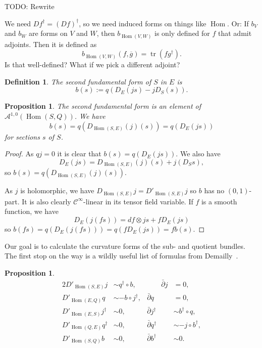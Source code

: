 \documentclass[10pt,a4paper]{article}
\newtheorem{prop}[theo]{Proposition}
\newtheorem{defi}[theo]{Definition}
\newtheorem*{proof}{Proof}
\newcommand{\cc}[1]{\mathcal{#1}}
\def\ov#1{\overline{#1}}
\DeclareMathOperator{\Hom}{Hom}
\DeclareMathOperator{\tr}{tr}
\begin{document}
TODO: Rewrite

We need $Df^\dagger = (Df)^\dagger$, so we need induced forms on things like $\Hom$. Or: If $b_V$ and $b_W$ are forms on $V$ and $W$, then $b_{\Hom(V,W)}$ is only defined for $f$ that admit adjoints. Then it is defined as
\[
b_{\Hom(V,W)}(f, \ov g) = \tr (f g^\dagger).
\]
Is that well-defined? What if we pick a different adjoint?


\begin{defi}
The \emph{second fundamental form} of $S$ in $E$ is
\[
b(s) := q(D_E(js) - jD_S(s)).
\]
\end{defi}

\begin{prop}
The second fundamental form is an element of $\cc A^{1,0}(\Hom(S,Q))$.
We have
\[
b(s)
= q(D_{\Hom(S,E)}(j)(s))
= q(D_E(js))
\]
for sections $s$ of $S$.
\end{prop}

\begin{proof}
As $qj = 0$ it is clear that $b(s) = q(D_E(js))$. We also have
\[
D_E(js) = D_{\Hom(S,E)}(j)(s) + j(D_Ss),
\]
so $b(s) = q(D_{\Hom(S,E)}(j)(s))$.

As $j$ is holomorphic, we have $D_{\Hom(S,E)}j = D'_{\Hom(S,E)}j$ so $b$ has no $(0,1)$-part. It is also clearly $\cc C^\infty$-linear in its tensor field variable. If $f$ is a smooth function, we have
\[
D_E(j(fs))
= df \otimes js + f D_E(js)
\]
so $b(fs) = q(D_E(j(fs))) = q(f D_E(js)) = fb(s)$.
\end{proof}



Our goal is to calculate the curvature forms of the sub- and quotient bundles. The first stop on the way is a wildly useful list of formulas from Demailly~{{\cite[Theorem~14.3]{demailly-complex}}}.


\begin{prop}
\label{prop:seq-formulas}
\begin{alignat*}{2}
D'_{\Hom(S,E)}j &\sim q^\dagger \circ b,
&
\qquad
\bar\partial j &= 0,
\\
D'_{\Hom(E, Q)} q &\sim - b \circ j^\dagger,
&
\bar\partial q &= 0,
\\
D'_{\Hom(E,S)} j^\dagger &\sim 0,
&
\bar\partial j^\dagger &\sim b^\dagger \circ q,
\\
D'_{\Hom(Q,E)} q^\dagger &\sim 0,
&
\bar\partial q^\dagger &\sim - j \circ b^\dagger,
\\
D'_{\Hom(S,Q)} b &\sim 0,
&
\bar\partial b^\dagger &\sim 0.
\end{alignat*}
\end{prop}
\end{document}
